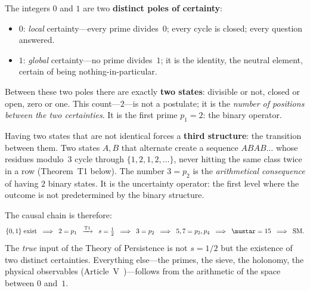 \documentclass[12pt,a4paper]{article}
\begin{document}
\begin{remark}
\label{rem:genesis}
The integers $0$ and $1$ are two \textbf{distinct poles of certainty}:
\begin{itemize}[nosep]
\item $0$: \emph{local} certainty---every prime divides~$0$;
  every cycle is closed; every question answered.
\item $1$: \emph{global} certainty---no prime divides~$1$;
  it is the identity, the neutral element, certain of being
  nothing-in-particular.
\end{itemize}

Between these two poles there are exactly \textbf{two states}:
divisible or not, closed or open, zero or one.  This count---$2$---is
not a postulate; it is the \emph{number of positions between the two
certainties}.  It is the first prime $p_1 = 2$: the binary operator.

Having two states that are not identical forces a
\textbf{third structure}: the transition between them.  Two states
$A, B$ that alternate create a sequence $A B A B \ldots$ whose
residues modulo~$3$ cycle through $\{1, 2, 1, 2, \ldots\}$, never
hitting the same class twice in a row (Theorem~T1 below).
The number $3 = p_2$ is the \emph{arithmetical consequence} of
having $2$ binary states.  It is the uncertainty operator: the first
level where the outcome is not predetermined by the binary structure.

The causal chain is therefore:
\begin{equation}
  \{0, 1\} \;\text{exist}
  \;\;\Longrightarrow\;\;
  2 = p_1
  \;\;\xrightarrow{\text{T1}}\;\;
  s = \tfrac{1}{2}
  \;\;\Longrightarrow\;\;
  3 = p_2
  \;\;\Longrightarrow\;\;
  5, 7 = p_3, p_4
  \;\;\Longrightarrow\;\;
  \mustar = 15
  \;\;\Longrightarrow\;\;
  \text{SM.}
  \label{eq:genesis}
\end{equation}
The \emph{true} input of the Theory of Persistence is not $s = 1/2$ but the
existence of two distinct certainties.  Everything else---the primes,
the sieve, the holonomy, the physical observables (Article~V~\cite{companion_M5})---follows from the
arithmetic of the space between $0$ and~$1$.
\end{remark}
\end{document}
